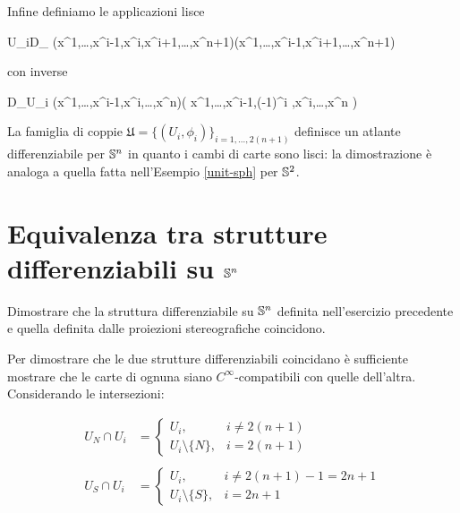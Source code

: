 Infine definiamo le applicazioni lisce

%
	{U_{i}}{D_{}}%
	{(x^{1},\dots,x^{i-1},x^{i},x^{i+1},\dots,x^{n+1})}{(x^{1},\dots,x^{i-1},x^{i+1},\dots,x^{n+1})}

con inverse

%
	{D_{}}{U_{i}}%
	{(x^{1},\dots,x^{i-1},x^{i},\dots,x^{n})}{\left( x^{1},\dots,x^{i-1},(-1)^{i} ,x^{i},\dots,x^{n} \right)}

La famiglia di coppie $ \mathfrak{U} = \{ (U_{i},\phi_{i}) \}_{i=1,\dots,2(n+1)} $ definisce un atlante differenziabile per $ \S^{n} $ in quanto i cambi di carte sono lisci: la dimostrazione è analoga a quella fatta nell'Esempio \ref{unit-sph} per $ \S^{2} $.

%

\newpage

%

\section{Equivalenza tra strutture differenziabili su $ \S^{n} $}\label{es2-2}

\begin{tcolorbox}
	Dimostrare che la struttura differenziabile su $ \S^{n} $ definita nell’esercizio precedente e quella definita dalle proiezioni
	stereografiche coincidono.
\end{tcolorbox}

Per dimostrare che le due strutture differenziabili coincidano è sufficiente mostrare che le carte di ognuna siano $ C^{\infty} $-compatibili con quelle dell'altra.\\
Considerando le intersezioni:

\begin{align}
	U_{N} \cap U_{i} &= %
	\begin{cases}
		U_{i}, & i \neq 2(n+1)\\
		U_{i} \setminus \{ N \}, & i = 2(n+1)
	\end{cases}\\
	\nonumber\\
	U_{S} \cap U_{i} &= %
	\begin{cases}
		U_{i}, & i \neq 2(n+1) - 1 = 2 n + 1\\
		U_{i} \setminus \{ S \}, & i = 2n+1
	\end{cases}
\end{align}

